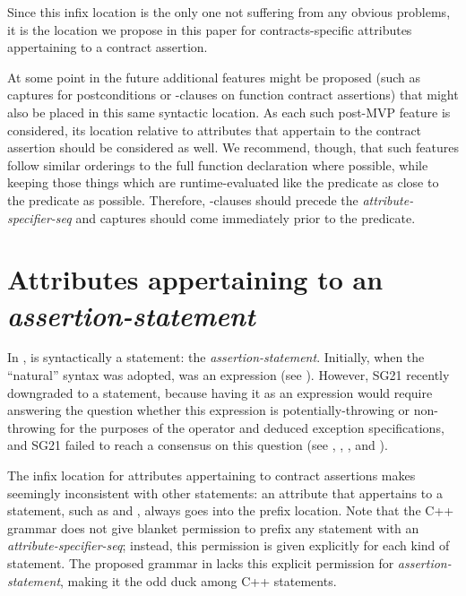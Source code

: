 Since this infix location is the only one not suffering from any obvious problems, it is the location we propose in this paper for contracts-specific attributes appertaining to a contract assertion.

At some point in the future additional features might be proposed (such as captures for postconditions or -clauses on function contract assertions) that might also be placed in this same syntactic location.   As each such post-MVP feature is considered, its location relative to attributes that appertain to the contract assertion should be considered as well. We recommend, though, that such features follow similar orderings to the full function declaration where possible, while keeping those things which are runtime-evaluated like the predicate as close to the predicate as possible.  Therefore, -clauses should precede the \emph{attribute-specifier-seq} and captures should come immediately prior to the predicate.



\section{Attributes appertaining to an \emph{assertion-statement}}
\label{sec:stmt}

In \cite{P2900R5},  is syntactically a statement: the \emph{assertion-statement}. Initially, when the ``natural'' syntax was adopted,  was an expression (see \cite{P2961R2}). However, SG21 recently downgraded  to a statement, because having it as an expression would require answering the question whether this expression is potentially-throwing or non-throwing for the purposes of the  operator and deduced exception specifications, and SG21 failed to reach a consensus on this question (see \cite{P2932R3}, \cite{P2969R0}, \cite{P3113R0}, and \cite{P3114R0}).

The infix location for attributes appertaining to contract assertions makes  seemingly inconsistent with other statements: an attribute that appertains to a statement, such as \tcode{[[likely]]} and \tcode{[[unlikely]]}, always goes into the prefix location. Note that the C++ grammar does not give blanket permission to prefix any statement with an  \emph{attribute-specifier-seq}; instead, this permission is given explicitly for each kind of statement. The proposed grammar in \cite{P2900R5} lacks this explicit permission for \emph{assertion-statement}, making it the odd duck among C++ statements.

